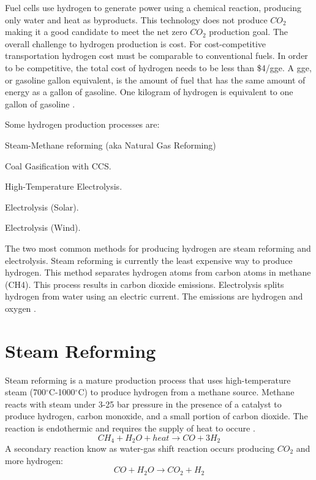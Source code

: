 Fuel cells use hydrogen to generate power using a chemical reaction, producing only water and heat as byproducts. This technology does not produce $CO_2$ making it a good candidate to meet the net zero $CO_2$ production goal. The overall challenge to hydrogen production is cost. For cost-competitive transportation hydrogen cost must be comparable to conventional fuels. In order to be competitive, the total  cost of hydrogen needs to be less than \$4/gge. A gge, or gasoline gallon equivalent, is the amount of fuel that has the same amount of energy as a gallon of gasoline. One kilogram of hydrogen is equivalent to one gallon of gasoline \cite{doe_hydrogen_2019}.

Some hydrogen production processes are: 
\begin{description}[font=$\bullet$\scshape\bfseries]
	\item[] Steam-Methane reforming (aka Natural Gas Reforming)
	\item[] Coal Gasification with CCS.
	\item[] High-Temperature Electrolysis.
	\item[] Electrolysis (Solar).
	\item[] Electrolysis (Wind).
\end{description}

The two most common methods for producing hydrogen are steam reforming and electrolysis.
Steam reforming is currently the least expensive way to produce hydrogen. This method separates hydrogen atoms from carbon atoms in methane (CH4). This process results in carbon dioxide emissions.
Electrolysis splits hydrogen from water using an electric current. The emissions are hydrogen and oxygen \cite{noauthor_production_2019}. 

\section{Steam Reforming}

Steam reforming is a mature production process that uses high-temperature steam (700$^{\circ}$C-1000$^{\circ}$C) to produce hydrogen from a methane source. Methane reacts with steam under 3-25 bar pressure in the presence of a catalyst to produce hydrogen, carbon monoxide, and a small portion of carbon dioxide. The reaction is endothermic and requires the supply of heat to occure \cite{doe_hydrogen_2019}.
\begin{equation}
CH_4 + H_2O + heat \rightarrow CO + 3H_2
\end{equation}
A secondary reaction know as water-gas shift reaction occurs producing $CO_2$ and more hydrogen:
\begin{equation}
CO + H_2O \rightarrow CO_2 + H_2
\end{equation}

